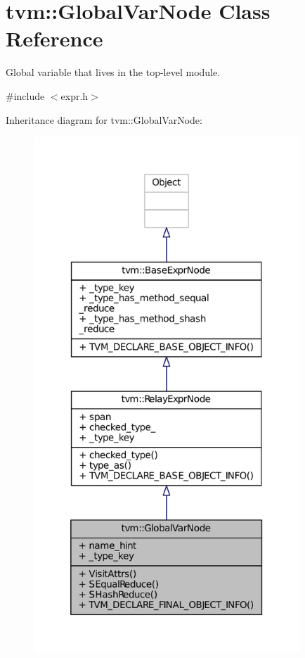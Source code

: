 \hypertarget{classtvm_1_1GlobalVarNode}{}\section{tvm\+:\+:Global\+Var\+Node Class Reference}
\label{classtvm_1_1GlobalVarNode}


Global variable that lives in the top-\/level module.  




{\ttfamily \#include $<$expr.\+h$>$}



Inheritance diagram for tvm\+:\+:Global\+Var\+Node\+:
\nopagebreak
\begin{figure}[H]
\begin{center}
\leavevmode
\includegraphics[height=550pt]{classtvm_1_1GlobalVarNode__inherit__graph}
\end{center}
\end{figure}


